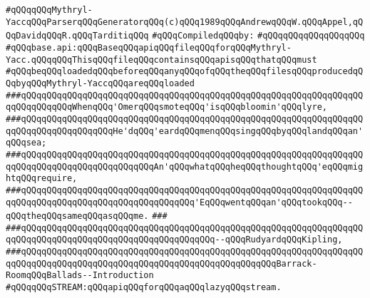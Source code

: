 \label{src/app/yacc/lib/base.api}
\verb|#qQQqqQQqMythryl-YaccqQQqParserqQQqGeneratorqQQq(c)qQQq1989qQQqAndrewqQQqW.qQQqAppel,qQQqDavidqQQqR.qQQqTarditiqQQq|\newline
\newline
\verb|#qQQqCompiledqQQqby:|\newline
\verb|#qQQqqQQqqQQqqQQqqQQq|\newline
\newline
\verb|#qQQqbase.api:qQQqBaseqQQqapiqQQqfileqQQqforqQQqMythryl-Yacc.qQQqqQQqThisqQQqfileqQQqcontainsqQQqapisqQQqthatqQQqmust|\newline
\verb|#qQQqbeqQQqloadedqQQqbeforeqQQqanyqQQqofqQQqtheqQQqfilesqQQqproducedqQQqbyqQQqMythryl-YaccqQQqareqQQqloaded|\newline
\newline
\newline
\newline
\verb|###qQQqqQQqqQQqqQQqqQQqqQQqqQQqqQQqqQQqqQQqqQQqqQQqqQQqqQQqqQQqqQQqqQQqqQQqqQQqqQQqWhenqQQq'OmerqQQqsmoteqQQq'isqQQqbloomin'qQQqlyre,|\newline
\verb|###qQQqqQQqqQQqqQQqqQQqqQQqqQQqqQQqqQQqqQQqqQQqqQQqqQQqqQQqqQQqqQQqqQQqqQQqqQQqqQQqqQQqqQQqHe'dqQQq'eardqQQqmenqQQqsingqQQqbyqQQqlandqQQqan'qQQqsea;|\newline
\verb|###qQQqqQQqqQQqqQQqqQQqqQQqqQQqqQQqqQQqqQQqqQQqqQQqqQQqqQQqqQQqqQQqqQQqqQQqqQQqqQQqqQQqqQQqqQQqqQQqAn'qQQqwhatqQQqheqQQqthoughtqQQq'eqQQqmightqQQqrequire,|\newline
\verb|###qQQqqQQqqQQqqQQqqQQqqQQqqQQqqQQqqQQqqQQqqQQqqQQqqQQqqQQqqQQqqQQqqQQqqQQqqQQqqQQqqQQqqQQqqQQqqQQqqQQqqQQq'EqQQqwentqQQqan'qQQqtookqQQq--qQQqtheqQQqsameqQQqasqQQqme.|\newline
\verb|###|\newline
\verb|###qQQqqQQqqQQqqQQqqQQqqQQqqQQqqQQqqQQqqQQqqQQqqQQqqQQqqQQqqQQqqQQqqQQqqQQqqQQqqQQqqQQqqQQqqQQqqQQqqQQqqQQqqQQq--qQQqRudyardqQQqKipling,|\newline
\verb|###qQQqqQQqqQQqqQQqqQQqqQQqqQQqqQQqqQQqqQQqqQQqqQQqqQQqqQQqqQQqqQQqqQQqqQQqqQQqqQQqqQQqqQQqqQQqqQQqqQQqqQQqqQQqqQQqqQQqqQQqBarrack-RoomqQQqBallads--Introduction|\newline
\newline
\newline
\newline
\verb|#qQQqqQQqSTREAM:qQQqapiqQQqforqQQqaqQQqlazyqQQqstream.|\newline
\newline
